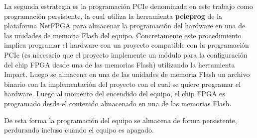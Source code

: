 La segunda estrategia es la programación PCIe denominada en este trabajo como programación persistente, la cual utiliza la herramienta \textbf{pcieprog} de la plataforma NetFPGA para almacenar la programaci\'on del hardware en una de las unidades de memoria Flash del equipo. Concretamente este procedimiento implica programar el hardware con un proyecto compatible con la programaci\'on PCIe (es necesario que el proyecto implemente un m\'odulo para la configuraci\'on del chip FPGA desde una de las memorias Flash) utilizando la herramienta Impact. Luego se almacena en una de las unidades de memoria Flash un archivo binario con la implementaci\'on del proyecto con el cual se quiere programar el hardware. Luego al momento del encendido del equipo, el chip FPGA es programado desde el contenido almacenado en una de las memorias Flash.

De esta forma la programaci\'on del equipo se almacena de forma persistente, perdurando incluso cuando el equipo es apagado.\\ 






